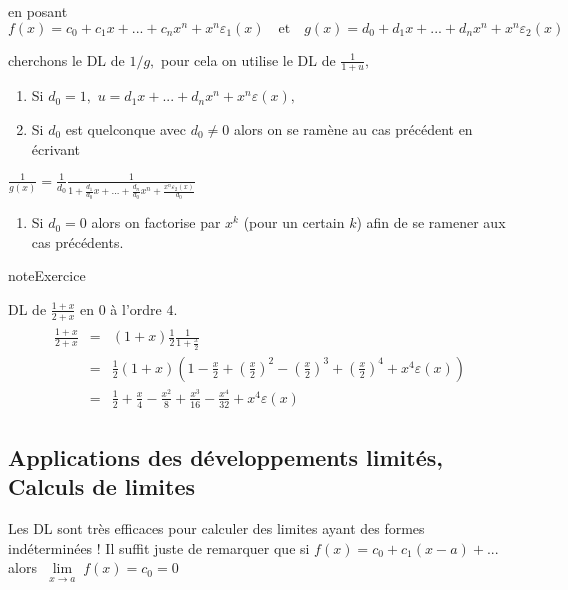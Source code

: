 \documentclass[letterpaper,10pt,french]{jupyterBook}
\begin{document}
\sphinxAtStartPar
en posant \(f(x)=c_0+c_1 x+...+c_n x^n +x^n \varepsilon_1 (x)\quad\mbox{et}\quad g(x)=d_0+d_1 x+...+d_n x^n +x^n \varepsilon_2 (x)\)

\sphinxAtStartPar
cherchons le DL de \(1/g,\) pour cela on utilise le DL de \(\frac{1}{1+u},\)
\begin{enumerate}
%
\item {} 
\sphinxAtStartPar
Si \(d_0=1,\) \(u=d_1 x+...+d_n x^n +x^n \varepsilon(x),\)

\item {} 
\sphinxAtStartPar
Si \(d_0\) est quelconque avec \(d_0 \neq0\) alors on se ramène au cas précédent en écrivant

\end{enumerate}

\sphinxAtStartPar
\(\frac{1}{g(x)}=\frac{1}{d_0}\frac{1}{1+\frac{d_1}{d_0}x+...+\frac{d_n}{d_0}x^n+\frac{x^n \varepsilon_2 (x)}{d_0}}\)
\begin{enumerate}
%
\item {} 
\sphinxAtStartPar
Si \(d_0 = 0\) alors on factorise par \(x^k\) (pour un certain \(k\)) afin de se ramener aux cas précédents.

\end{enumerate}

\begin{sphinxadmonition}{note}{Exercice}

\sphinxAtStartPar
DL de \(\frac{1+x}{2+x}\) en \(0\) à l’ordre \(4.\)
\begin{equation*}
\begin{split}
\begin{eqnarray*}
\frac{1+x}{2+x}
&=& (1+x)\frac{1}{2}\frac{1}{1+\frac{x}{2}}\\
&=& \frac{1}{2}(1+x)(1-\frac{x}{2}+(\frac{x}{2})^2-(\frac{x}{2})^3+(\frac{x}{2})^4+x^4 \varepsilon(x))\\
&=& \frac{1}{2}+\frac{x}{4}-\frac{x^2}{8}+\frac{x^3}{16}-\frac{x^4}{32}+x^4 \varepsilon(x)
\end{eqnarray*}
\end{split}
\end{equation*}\end{sphinxadmonition}


\subsection{Applications des développements limités, Calculs de limites}
\label{\detokenize{dl:applications-des-developpements-limites-calculs-de-limites}}
\sphinxAtStartPar
Les DL sont très efficaces pour calculer des limites ayant des formes indéterminées ! Il suffit juste de remarquer que si \(f(x)=c_0+c_1 (x-a)+...\) alors \(\lim\limits_{\substack{x \rightarrow a}}f(x)=c_0=0\)
\end{document}
